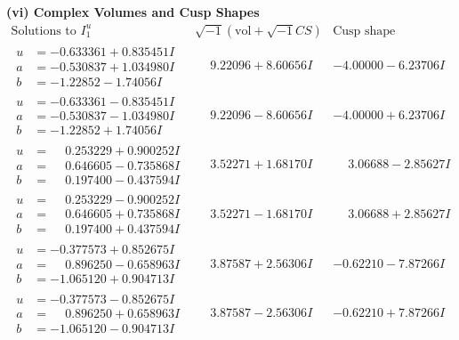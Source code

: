 \documentclass[1p]{elsarticle_modified}
\theoremstyle{definition}
\newcommand{\I}{\sqrt{-1}}
\begin{document}
\newpage\flushleft \textbf{(vi) Complex Volumes and Cusp Shapes}
$$\begin{array}{c|c|c}  
\text{Solutions to }I^u_{1}& \I (\text{vol} + \sqrt{-1}CS) & \text{Cusp shape}\\
 \hline 
\begin{aligned}
u &= -0.633361 + 0.835451 I \\
a &= -0.530837 + 1.034980 I \\
b &= -1.22852 - 1.74056 I\end{aligned}
 & \phantom{-}9.22096 + 8.60656 I & -4.00000 - 6.23706 I \\ \hline\begin{aligned}
u &= -0.633361 - 0.835451 I \\
a &= -0.530837 - 1.034980 I \\
b &= -1.22852 + 1.74056 I\end{aligned}
 & \phantom{-}9.22096 - 8.60656 I & -4.00000 + 6.23706 I \\ \hline\begin{aligned}
u &= \phantom{-}0.253229 + 0.900252 I \\
a &= \phantom{-}0.646605 - 0.735868 I \\
b &= \phantom{-}0.197400 - 0.437594 I\end{aligned}
 & \phantom{-}3.52271 + 1.68170 I & \phantom{-}3.06688 - 2.85627 I \\ \hline\begin{aligned}
u &= \phantom{-}0.253229 - 0.900252 I \\
a &= \phantom{-}0.646605 + 0.735868 I \\
b &= \phantom{-}0.197400 + 0.437594 I\end{aligned}
 & \phantom{-}3.52271 - 1.68170 I & \phantom{-}3.06688 + 2.85627 I \\ \hline\begin{aligned}
u &= -0.377573 + 0.852675 I \\
a &= \phantom{-}0.896250 - 0.658963 I \\
b &= -1.065120 + 0.904713 I\end{aligned}
 & \phantom{-}3.87587 + 2.56306 I & -0.62210 - 7.87266 I \\ \hline\begin{aligned}
u &= -0.377573 - 0.852675 I \\
a &= \phantom{-}0.896250 + 0.658963 I \\
b &= -1.065120 - 0.904713 I\end{aligned}
 & \phantom{-}3.87587 - 2.56306 I & -0.62210 + 7.87266 I \\ \hline\begin{aligned}

\end{aligned}
\end{array}$$
\end{document}
